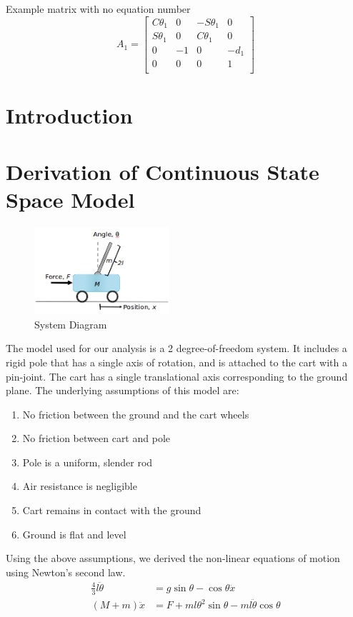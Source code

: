 \documentclass{article}
\begin{document}
Example matrix with no equation number
\[
A_{1} = 
\begin{bmatrix}
	C\theta_{1} & 0 & -S\theta_{1} & 0 \\
	S\theta_{1} & 0 & C\theta_{1} & 0  \\
	0 & -1 & 0 & -d_{1} \\
	0 & 0 & 0 & 1 \\ 
\end{bmatrix}
\]

\section{Introduction}
\section{Derivation of Continuous State Space Model}
\begin{figure}[h!]
	\centering
	\includegraphics[width=5cm,keepaspectratio]{SystemDiagram.png}
	\caption{System Diagram}
	\label{fig:sys_diagram}
\end{figure}
The model used for our analysis is a 2 degree-of-freedom system. It includes a rigid pole that has a single axis of rotation, and is attached to the cart with a pin-joint. The cart has a single translational axis corresponding to the ground plane. The underlying assumptions of this model are:
\begin{enumerate}
\item No friction between the ground and the cart wheels
\item No friction between cart and pole
\item Pole is a uniform, slender rod
\item Air resistance is negligible
\item Cart remains in contact with the ground
\item Ground is flat and level
\end{enumerate}
 Using the above assumptions, we derived the non-linear equations of motion using Newton's second law.
\begin{equation}
\begin{aligned}
\frac{4}{3}l \ddot{\theta} &= g \sin \theta - \cos \theta \ddot{x} \\
(M+m)\ddot{x} &= F + ml \theta^2 \sin\theta -ml\ddot{\theta}\cos\theta
\end{aligned}
\label{eq:EOM_nonlinear}
\end{equation}
\end{document}
